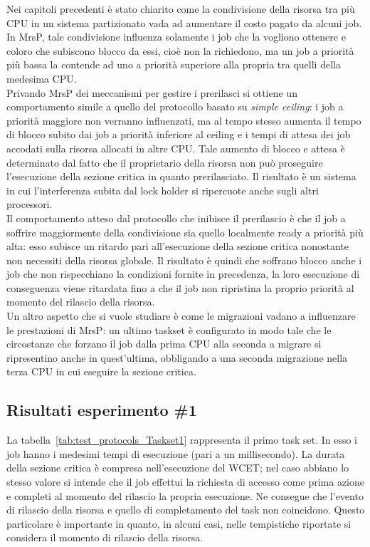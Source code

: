 Nei capitoli precedenti è stato chiarito come la condivisione della risorsa tra più CPU in un sistema partizionato vada ad aumentare il costo pagato da alcuni job. In MrsP, tale condivisione influenza solamente i job che la vogliono ottenere e coloro che subiscono blocco da essi, cioè non la richiedono, ma un job a priorità più bassa la contende ad uno a priorità superiore alla propria tra quelli della medesima CPU.\\

Privando MrsP dei meccanismi per gestire i prerilasci si ottiene un comportamento simile a quello del protocollo basato su \textit{simple ceiling}: i job a priorità maggiore non verranno influenzati, ma al tempo stesso aumenta il tempo di blocco subito dai job a priorità inferiore al ceiling e i tempi di attesa dei job accodati sulla risorsa allocati in altre CPU. Tale aumento di blocco e attesa è determinato dal fatto che il proprietario della risorsa non può proseguire l'esecuzione della sezione critica in quanto prerilasciato. Il risultato è un sistema in cui l'interferenza subita dal lock holder si ripercuote anche sugli altri processori.\\

Il comportamento atteso dal protocollo che inibisce il prerilascio è che il job a soffrire maggiormente della condivisione sia quello localmente ready a priorità più alta: esso subisce un ritardo pari all'esecuzione della sezione critica nonostante non necessiti della risorsa globale. Il risultato è quindi che soffrano blocco anche i job che non rispecchiano la condizioni fornite in precedenza, la loro esecuzione di conseguenza viene ritardata fino a che il job non ripristina la proprio priorità al momento del rilascio della risorsa.\\

Un altro aspetto che si vuole studiare è come le migrazioni vadano a influenzare le prestazioni di MrsP: un ultimo taskset è configurato in modo tale che le circostanze che forzano il job dalla prima CPU alla seconda a migrare si ripresentino anche in quest'ultima, obbligando a una seconda migrazione nella terza CPU in cui eseguire la sezione critica.

\subsection{Risultati esperimento \#1}
\label{sec:confronto_protocolli_ris}

La tabella~\ref{tab:test_protocols_Taskset1} rappresenta il primo task set. In esso i job hanno i medesimi tempi di esecuzione (pari a un millisecondo). La durata della sezione critica è compresa nell'esecuzione del WCET; nel caso abbiano lo stesso valore si intende che il job effettui la richiesta di accesso come prima azione e completi al momento del rilascio la propria esecuzione. Ne consegue che l'evento di rilascio della risorsa e quello di completamento del task non coincidono. Questo particolare è importante in quanto, in alcuni casi, nelle tempistiche riportate si considera il momento di rilascio della risorsa.\\


